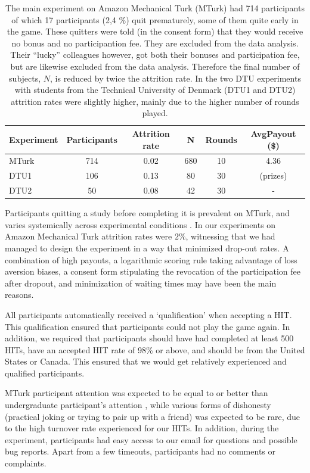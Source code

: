 \documentclass[a4paper,superscriptaddress,nofootinbib]{revtex4}
\begin{document}
\begin{table} %
\centering
\begin{tabular}{lccccc}
\hline
Experiment   &   Participants &   Attrition rate &   N & Rounds & AvgPayout  (\$) \\
\hline
 MTurk 	& 714 &  0.02 &  680 & 10 & 4.36    \\
 DTU1  	& 106 &  0.13 &  80 & 30 & (prizes)   \\
 DTU2  	&   50 &  0.08 &  42 & 30 & - \\
\hline
\end{tabular}
\caption{The main experiment on Amazon Mechanical Turk (MTurk) had 714 participants of which 17 participants (2,4 \%) quit prematurely, some of them quite early in the game. These quitters were told (in the consent form) that they would receive no bonus and no participantion fee. They are excluded from the data analysis. Their ``lucky'' colleagues however, got both their bonuses and participation fee, but are likewise excluded from the data analysis. Therefore the final number of subjects, $N$, is reduced by twice the attrition rate. In the two DTU experiments with students from the Technical University of Denmark (DTU1 and DTU2) attrition rates were slightly higher, mainly due to the higher number of rounds played.}
\label{table:A1}
\end{table}

Participants quitting a study before completing it is prevalent on MTurk, and varies systemically across experimental conditions \cite{ZhouFishbach16}. In our experiments on Amazon Mechanical Turk attrition rates were $2\%$, witnessing that we had managed to design the experiment in a way that minimized drop-out rates. A combination of high payouts, a logarithmic scoring rule taking advantage of loss aversion biases, a consent form stipulating the revocation of the participation fee after dropout, and minimization of waiting times may have been the main reasons.

All participants automatically received a `qualification' when accepting a HIT. This qualification ensured that participants could not play the game again. In addition, we required that participants should have had completed at least 500 HITs, have an accepted HIT rate of 98\% or above, and should be from the United States or Canada. This ensured that we would get relatively experienced and qualified participants.

MTurk participant attention was expected to be equal to or better than undergraduate participant's attention \cite{Rand2012}, while various forms of dishonesty (practical joking or trying to pair up with a friend) was expected to be rare, due to the high turnover rate experienced for our HITs. In addition, during the experiment, participants had easy access to our email for questions and possible bug reports. Apart from a few timeouts, participants had no comments or complaints.
\end{document}
